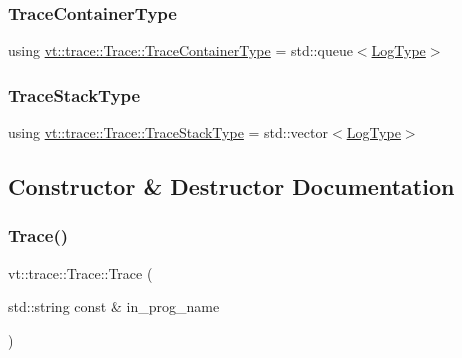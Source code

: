 \mbox{\label{structvt_1_1trace_1_1_trace_a9d07ee9d9e92f63674da9954cfe9830b}} 
\subsubsection{\texorpdfstring{Trace\+Container\+Type}{TraceContainerType}}
{\footnotesize\ttfamily using \hyperlink{structvt_1_1trace_1_1_trace_a9d07ee9d9e92f63674da9954cfe9830b}{vt\+::trace\+::\+Trace\+::\+Trace\+Container\+Type} =  std\+::queue$<$\hyperlink{structvt_1_1trace_1_1_trace_a43306d96a91e49db081eaea016f1dd0a}{Log\+Type}$>$}

\mbox{\label{structvt_1_1trace_1_1_trace_af27d223028d10a196680513defcef3d6}} 
\subsubsection{\texorpdfstring{Trace\+Stack\+Type}{TraceStackType}}
{\footnotesize\ttfamily using \hyperlink{structvt_1_1trace_1_1_trace_af27d223028d10a196680513defcef3d6}{vt\+::trace\+::\+Trace\+::\+Trace\+Stack\+Type} =  std\+::vector$<$\hyperlink{structvt_1_1trace_1_1_trace_a43306d96a91e49db081eaea016f1dd0a}{Log\+Type}$>$}



\subsection{Constructor \& Destructor Documentation}
\mbox{\label{structvt_1_1trace_1_1_trace_a2b736f560ee446cbd84aaf96e25c8d0b}} 
\subsubsection{\texorpdfstring{Trace()}{Trace()}}
{\footnotesize\ttfamily vt\+::trace\+::\+Trace\+::\+Trace (\begin{DoxyParamCaption}\item[{std\+::string const \&}]{in\+\_\+prog\+\_\+name }\end{DoxyParamCaption})}

